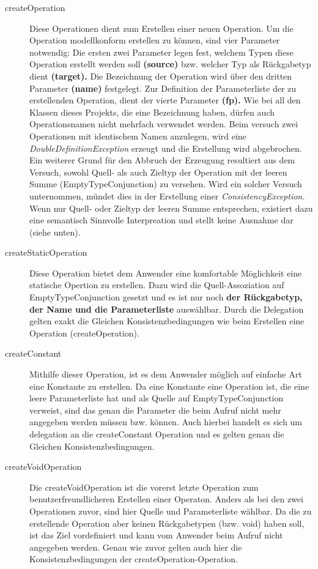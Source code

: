 \begin{description}
\item[createOperation]
Diese Operationen dient zum Erstellen einer neuen Operation. Um die Operation modellkonform erstellen zu können, sind vier Parameter notwendig:
Die ersten zwei Parameter legen fest, welchem Typen diese Operation erstellt werden soll \textbf{(source)} bzw. welcher Typ als Rückgabetyp dient \textbf{(target).}
Die Bezeichnung der Operation wird über den dritten Parameter \textbf{(name)} festgelegt. 
Zur Definition der Parameterliste der zu erstellenden Operation, dient der vierte Parameter \textbf{(fp).}
Wie bei all den Klassen dieses Projekts, die eine Bezeichnung haben, dürfen auch Operationsnamen nicht mehrfach verwendet werden. Beim versuch zwei Operationen mit identischem Namen anzulegen, wird eine \emph{DoubleDefinitionException} erzeugt und die Erstellung wird abgebrochen. Ein weiterer Grund für den Abbruch der Erzeugung resultiert aus dem Versuch, sowohl Quell- als auch Zieltyp der Operation mit der leeren Summe (EmptyTypeConjunction) zu versehen. Wird ein solcher Versuch unternommen, mündet dies in der Erstellung einer \emph{ConsistencyException.} Wenn nur Quell- oder Zieltyp der leeren Summe entsprechen, existiert dazu eine semantisch Sinnvolle Interpreation und stellt keine Ausnahme dar (siehe unten).
\item[createStaticOperation]
Diese Operation bietet dem Anwender eine komfortable Möglichkeit eine statische Opertion zu erstellen. Dazu wird die Quell-Assoziation auf EmptyTypeConjunction gesetzt und es ist nur noch \textbf{der Rückgabetyp, der Name und die Parameterliste} auswählbar. Durch die Delegation gelten exakt die Gleichen Konsistenzbedingungen wie beim Erstellen eine Operation (createOperation).
\item[createConstant]
Mithilfe dieser Operation, ist es dem Anwender möglich auf einfache Art eine Konstante zu erstellen. Da eine Konstante eine Operation ist, die eine leere Parameterliste hat und als Quelle auf EmptyTypeConjunction verweist, sind das genau die Parameter die beim Aufruf nicht mehr angegeben werden müssen bzw. können. Auch hierbei handelt es sich um delegation an die createConstant Operation und es gelten genau die Gleichen Konsistenzbedingungen.
\item[createVoidOperation]
Die createVoidOperation ist die vorerst letzte Operation zum benutzerfreundlicheren Erstellen einer Operaton. Anders als bei den zwei Operationen zuvor, sind hier Quelle und Parameterliste wählbar. Da die zu erstellende Operation aber keinen Rückgabetypen (bzw. void) haben soll, ist das Ziel vordefiniert und kann vom Anwender beim Aufruf nicht angegeben werden. Genau wie zuvor gelten auch hier die Konsistenzbedingungen der createOperation-Operation.

\end{description}
